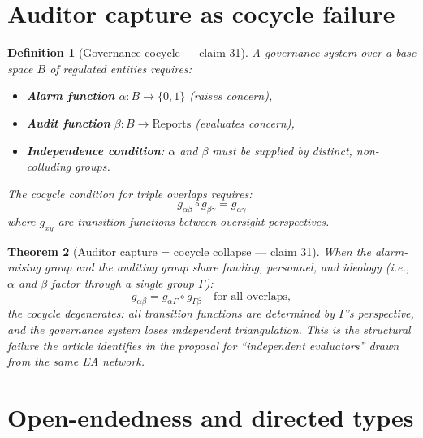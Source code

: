 \documentclass[11pt,a4paper]{article}
\newtheorem{definition}{Definition}[section]
\newtheorem{theorem}[definition]{Theorem}
\begin{document}
\section{Auditor capture as cocycle failure}
\label{sec:auditor-capture}

\begin{definition}[Governance cocycle --- claim 31]
\label{def:gov-cocycle}
A \emph{governance system} over a base space $B$ of regulated entities
requires:
\begin{itemize}
\item \textbf{Alarm function} $\alpha : B \to \{0,1\}$ (raises concern),
\item \textbf{Audit function} $\beta : B \to \text{Reports}$ (evaluates concern),
\item \textbf{Independence condition}: $\alpha$ and $\beta$ must be
  supplied by distinct, non-colluding groups.
\end{itemize}
The cocycle condition for triple overlaps requires:
\[
  g_{\alpha\beta} \circ g_{\beta\gamma} = g_{\alpha\gamma}
\]
where $g_{xy}$ are transition functions between oversight perspectives.
\end{definition}

\begin{theorem}[Auditor capture = cocycle collapse --- claim 31]
\label{thm:auditor-capture}
When the alarm-raising group and the auditing group share funding,
personnel, and ideology (i.e., $\alpha$ and $\beta$ factor through
a single group $\Gamma$):
\[
  g_{\alpha\beta} = g_{\alpha\Gamma} \circ g_{\Gamma\beta}
  \quad \text{for all overlaps},
\]
the cocycle degenerates: all transition functions are determined by
$\Gamma$'s perspective, and the governance system loses independent
triangulation. This is the structural failure the article identifies
in the proposal for ``independent evaluators'' drawn from the same
EA network.
\end{theorem}

\section{Open-endedness and directed types}
\label{sec:open-ended}
\end{document}
